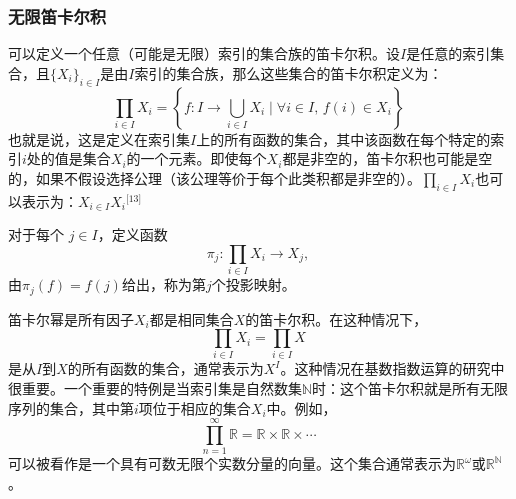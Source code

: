 \subsubsection{无限笛卡尔积} 
可以定义一个任意（可能是无限）索引的集合族的笛卡尔积。设\( I \)是任意的索引集合，且\( \{X_i\}_{i \in I} \)是由\( I \)索引的集合族，那么这些集合的笛卡尔积定义为：
\[
\prod_{i \in I} X_i = \left\{ f : I \to \bigcup_{i \in I} X_i \mid \forall i \in I, \, f(i) \in X_i \right\}~
\]
也就是说，这是定义在索引集\( I \)上的所有函数的集合，其中该函数在每个特定的索引\( i \)处的值是集合\( X_i \)的一个元素。即使每个\( X_i \)都是非空的，笛卡尔积也可能是空的，如果不假设选择公理（该公理等价于每个此类积都是非空的）。\(\prod_{i \in I} X_i\)也可以表示为：\(X_{i \in I} X_i\)\(^\text{[13]}\)

对于每个 \( j \in I \)，定义函数  
\[
\pi_j: \prod_{i \in I} X_i \to X_j,~
\]  
由\(\pi_j(f) = f(j)\)给出，称为第\( j \)个投影映射。

笛卡尔幂是所有因子\( X_i \)都是相同集合\( X \)的笛卡尔积。在这种情况下，  
\[
\prod_{i \in I} X_i = \prod_{i \in I} X~
\]  
是从\( I \)到\( X \)的所有函数的集合，通常表示为\( X^I \)。这种情况在基数指数运算的研究中很重要。一个重要的特例是当索引集是自然数集\( \mathbb{N} \)时：这个笛卡尔积就是所有无限序列的集合，其中第\( i \)项位于相应的集合\( X_i \)中。例如，  
\[
\prod_{n=1}^{\infty} \mathbb{R} = \mathbb{R} \times \mathbb{R} \times \cdots~
\]  
可以被看作是一个具有可数无限个实数分量的向量。这个集合通常表示为\( \mathbb{R}^\omega \)或\( \mathbb{R}^{\mathbb{N}} \)。